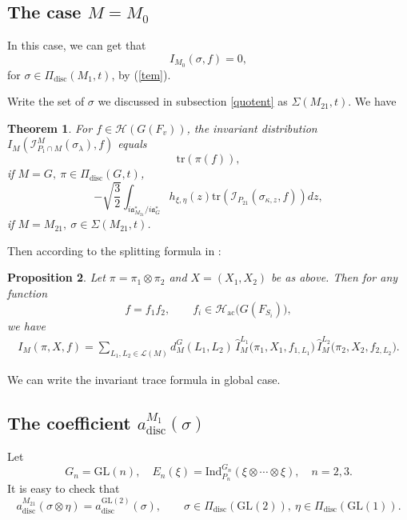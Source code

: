 \documentclass[11pt]{amsart}
\newtheorem {theorem}    {Theorem}[section]
\newtheorem {proposition}[theorem]    {Proposition}
\renewcommand{\rm}{\mathrm}
\newcommand{\GGL}{\mathrm{GL}}
\theoremstyle{definition}
\numberwithin{equation}{section}
\begin{document}
	
	
	
	
	
	
	
	
	
	
	
	
	
	
	
	
	
	
	\subsection{The case \(M=M_0\)}
	In this case, we can get that 
	\[I_{M_0}(\sigma,f)=0,\]for \(\sigma\in \Pi_{\rm{disc}}(M_1,t)\), by (\ref{tem}).

    Write the set of \(\sigma\) we discussed in subsection \ref{quotent} as \(\Sigma(M_{21},t)\). We have
    \begin{theorem}\label{spectr}
        For \(f\in\mathcal{H}(G(F_v))\), the invariant distribution \(I_M \left( \mathscr{I}_{P_1\cap M}^M(\sigma_\lambda), f \right)\) equals
\[ \rm{tr}({\pi}(f)),\]if \(M=G,\ \pi\in \Pi_{\rm{disc}}(G,t)\),\[-\sqrt{\frac{3}{2}}\int_{i\mathfrak{a}_{M_{21}}^*/i\mathfrak{a}_G^*}h_{\xi,\eta}(z)\rm{tr}(\mathscr{I}_{P_{21}}(\sigma_{\kappa,z},f))dz,\]if \(M=M_{21},\ \sigma\in\Sigma(M_{21},t)\).
    \end{theorem}


    Then according to the splitting formula in \cite{Art88(1)}:
    \begin{proposition}
        Let $\pi=\pi_1\otimes\pi_2$ and $X=(X_1,X_2)$ be as above.
Then for any function
\[
f=f_1f_2,\qquad
f_i\in\mathcal H_{\mathrm{ac}}\bigl(G(F_{S_i})\bigr),
\]
we have
\begin{align*}
    I_M(\pi,X,f)
=
\sum_{L_1,L_2\in\mathcal L(M)}
d_M^G(L_1,L_2)\,
\widehat I_M^{L_1}
\bigl(\pi_1,X_1,f_{1,L_1}\bigr)\,
\widehat I_M^{L_2}
\bigl(\pi_2,X_2,f_{2,L_2}\bigr).
\end{align*}
    \end{proposition}
We can write the invariant trace formula in global case.



    
	\subsection{The coefficient \(a^{M_1}_{\rm{disc}}(\sigma)\)}
	Let
	\[
	G_n = \mathrm{GL}(n), \quad E_n(\xi) = \rm{Ind}_{P_n}^{G_n}(\xi \otimes \cdots \otimes \xi), \quad n = 2, 3.
	\]
	It is easy to check that \[a^{M_{21}}_{\rm{disc}}(\sigma\otimes \eta)=a^{\GGL(2)}_{\rm{disc}}(\sigma),\qquad \sigma\in \Pi_{\rm{disc}}(\GGL(2)),\ \eta\in \Pi_{\rm{disc}}(\GGL(1)).\]
	
\end{document}
